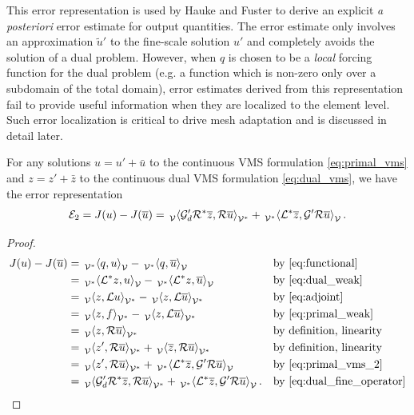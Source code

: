 This error representation is used by Hauke and Fuster
\cite{hauke2009variational} to derive an explicit
\emph{a posteriori} error estimate for output quantities.
The error estimate only involves an approximation
$\tilde{u}'$ to the fine-scale solution $u'$ and
completely avoids the solution of a dual problem.
However, when $q$ is chosen to be a \emph{local}
forcing function for the dual problem (e.g. a function
which is non-zero only over a subdomain of the total
domain), error estimates derived from this
representation fail to provide useful information
when they are localized to the element level.
Such error localization is critical to drive
mesh adaptation and is discussed in detail later.

\begin{prop}
For any solutions $u = u' + \bar{u}$ to the continuous VMS
formulation \eqref{eq:primal_vms} and $z = z' + \bar{z}$ to the
continuous dual VMS formulation \eqref{eq:dual_vms}, we have the
error representation
%
\begin{gather}
\mathcal{E}_2 = J(u) - J(\overline{u}) =
\,{}_{\mathcal{V}}^{}\!\left< {\mathcal{G}'_d \mathcal{R}^* \overline{z}}, { \mathcal{R} \overline{u}} \right>_{\mathcal{V}^*} +
\,{}_{\mathcal{V}^*}^{}\!\left< {\mathcal{L}^* \overline{z}}, {\mathcal{G}' \mathcal{R} \overline{u}} \right>_{\mathcal{V}}.
\label{eq:error_cont_1}
\end{gather}
%
\end{prop}

\begin{proof}
%
\begin{gather*}
\begin{aligned}
J(u) - J(\bar{u}) &=
\paira{q}{u} - \paira{q}{\bar{u}}
&& \text{by \eqref{eq:functional}} \\
&= \paira{\OP^* z}{u} - \paira{\OP^* z}{\bar{u}}
&& \text{by \eqref{eq:dual_weak}} \\
&= \pairb{z}{\OP u} - \pairb{z}{\OP \bar{u}}
&& \text{by \eqref{eq:adjoint}} \\
&= \pairb{z}{f} - \pairb{z}{\OP \bar{u}}
&& \text{by \eqref{eq:primal_weak}} \\
&= \pairb{z}{\R \bar{u}}
&& \text{by definition, linearity} \\
&= \pairb{z'}{\R \bar{u}} + \pairb{\bar{z}}{\R \bar{u}}
&& \text{by definition, linearity} \\
&= \pairb{z'}{\R \bar{u}} + \paira{\OP^* \bar{z}}{\G' \R \bar{u}}
&& \text{by \eqref{eq:primal_vms_2}} \\
&= \pairb{\G'_d \R^* \bar{z}}{\R \bar{u}} +
\paira{\OP^* \bar{z}}{\G' \R \bar{u}}.
&& \text{by \eqref{eq:dual_fine_operator}}
\end{aligned}
\label{eq:error_cont_2}
\end{gather*}
\end{proof}

